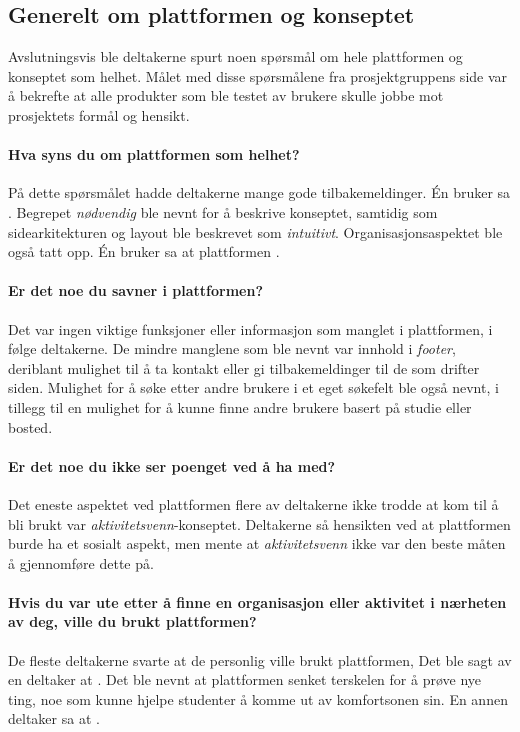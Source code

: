 \subsection{Generelt om plattformen og konseptet}

Avslutningsvis ble deltakerne spurt noen spørsmål om hele plattformen og konseptet som helhet. Målet med disse spørsmålene fra prosjektgruppens side var å bekrefte at alle produkter som ble testet av brukere skulle jobbe mot prosjektets formål og hensikt.

\paragraph{Hva syns du om plattformen som helhet?}
På dette spørsmålet hadde deltakerne mange gode tilbakemeldinger. Én bruker sa . Begrepet {\em nødvendig} ble nevnt for å beskrive konseptet, samtidig som sidearkitekturen og layout ble beskrevet som {\em intuitivt}. Organisasjonsaspektet ble også tatt opp. Én bruker sa at plattformen .

\paragraph{Er det noe du savner i plattformen?}
Det var ingen viktige funksjoner eller informasjon som manglet i plattformen, i følge deltakerne. De mindre manglene som ble nevnt var innhold i {\em footer}, deriblant mulighet til å ta kontakt eller gi tilbakemeldinger til de som drifter siden. Mulighet for å søke etter andre brukere i et eget søkefelt ble også nevnt, i tillegg til en mulighet for å kunne finne andre brukere basert på studie eller bosted.

\paragraph{Er det noe du ikke ser poenget ved å ha med?}
Det eneste aspektet ved plattformen flere av deltakerne ikke trodde at kom til å bli brukt var {\em aktivitetsvenn}-konseptet. Deltakerne så hensikten ved at plattformen burde ha et sosialt aspekt, men mente at {\em aktivitetsvenn} ikke var den beste måten å gjennomføre dette på.

\paragraph{Hvis du var ute etter å finne en organisasjon eller aktivitet i nærheten av deg, ville du brukt plattformen?}
De fleste deltakerne svarte at de personlig ville brukt plattformen, Det ble sagt av en deltaker at . Det ble nevnt at plattformen senket terskelen for å prøve nye ting, noe som kunne hjelpe studenter å komme ut av komfortsonen sin. En annen deltaker sa at .

